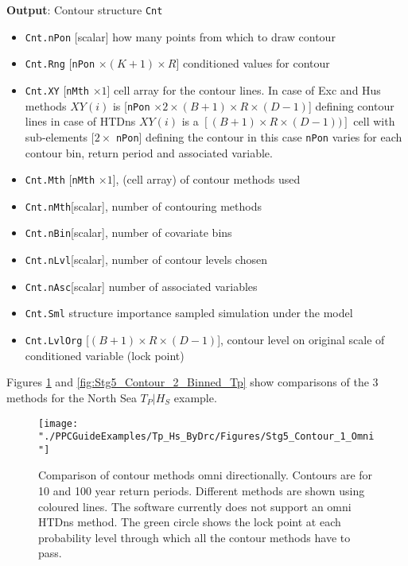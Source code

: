 \textbf{Output}: Contour structure \verb|Cnt|
\begin{itemize}
	\item \verb|Cnt.nPon| [scalar] how many points from which to draw contour
	\item \verb|Cnt.Rng| [\verb|nPon| $ \times (K+1) \times R$] conditioned values for contour
	\item \verb|Cnt.XY| [\verb|nMth| $ \times 1$] cell array for the contour lines. In case of Exc and Hus methods $XY(i)$ is [\verb|nPon| $\times 2 \times (B+1) \times R \times (D-1)$] defining contour lines in case of HTDns $XY(i)$ is a $[(B+1)\times R \times (D-1))]$ cell with sub-elements $[2 \times $ \verb|nPon|] defining the contour in this case \verb|nPon| varies for each contour bin, return period and associated variable. 
	\item \verb|Cnt.Mth|  [\verb|nMth| $ \times 1$], (cell array) of contour methods used
	\item \verb|Cnt.nMth|[scalar], number of contouring methods
	\item \verb|Cnt.nBin|[scalar], number of covariate bins
	\item \verb|Cnt.nLvl|[scalar], number of contour levels chosen
	\item \verb|Cnt.nAsc|[scalar] number of associated variables
	\item \verb|Cnt.Sml| structure importance sampled simulation under the model       
	\item \verb|Cnt.LvlOrg| [$(B+1) \times R \times (D-1)$], contour level on original scale of conditioned variable (lock point)
	
\end{itemize}

Figures \ref{fig:Stg5_Contour_1_Omni} and \ref{fig:Stg5_Contour_2_Binned_Tp} show comparisons of the 3 methods for the North Sea $T_P| H_S$ example. 

\begin{figure}
	\centering
	\texttt{[image: "./PPCGuideExamples/Tp\_Hs\_ByDrc/Figures/Stg5\_Contour\_1\_Omni"]}
	\caption{Comparison of contour methods omni directionally. Contours are for 10 and 100 year return periods. Different methods are shown using coloured lines. The software currently does not support an omni HTDns method. The green circle shows the lock point at each probability level through which all the contour methods have to pass.}
	\label{fig:Stg5_Contour_1_Omni}
\end{figure}

